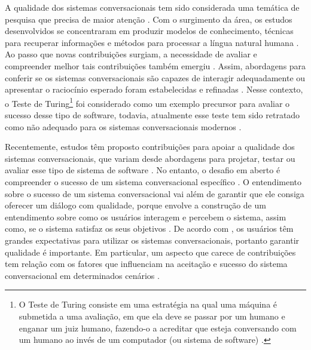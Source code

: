 A qualidade dos sistemas conversacionais tem sido considerada uma temática de pesquisa que precisa de maior atenção \cite{Wambsganss:2020, Ruane:2018, Ultes:2013, goh2007}. Com o surgimento da área, os estudos desenvolvidos se concentraram em produzir modelos de conhecimento, técnicas para recuperar informações e métodos para processar a língua natural humana \cite{abdul2015survey}. Ao passo que novas contribuições surgiam, a necessidade de avaliar e compreender melhor tais contribuições também emergiu \cite{Jain:2018, radziwill2017, abushawar2016}. Assim, abordagens para conferir se os sistemas conversacionais são capazes de interagir adequadamente ou apresentar o raciocínio esperado foram estabelecidas e refinadas \cite{Sugiyama2019, Voorhees2008}. Nesse contexto, o Teste de Turing\footnote{O Teste de Turing consiste em uma estratégia na qual uma máquina é submetida a uma avaliação, em que ela deve se passar por um humano e enganar um juiz humano, fazendo-o a acreditar que esteja conversando com um humano ao invés de um computador (ou sistema de software) \cite{Turing:1950}.} foi considerado como um exemplo precursor para avaliar o sucesso desse tipo de software, todavia, atualmente esse teste tem sido retratado como não adequado para os sistemas conversacionais modernos \cite{kaleem2016}. 

Recentemente, estudos têm proposto contribuições para apoiar a qualidade dos sistemas conversacionais, que variam desde abordagens para projetar, testar ou avaliar esse tipo de sistema de software \cite{deriu2020, liu:2016}. No entanto, o desafio em aberto é compreender o sucesso de um sistema conversacional específico \cite{kaleem2016}. O entendimento sobre o sucesso de um sistema conversacional vai além de garantir que ele consiga oferecer um diálogo com qualidade, porque envolve a construção de um entendimento sobre como os usuários interagem e percebem o sistema, assim como, se o sistema satisfaz os seus objetivos \cite{SCHMITT201512}. De acordo com , os usuários têm grandes expectativas para utilizar os sistemas conversacionais, portanto garantir qualidade é importante. Em particular, um aspecto que carece de contribuições tem relação com os fatores que influenciam na aceitação e sucesso do sistema conversacional em determinados cenários \cite{kaleem2016}.

